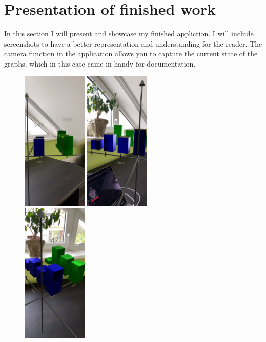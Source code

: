 \chapter{Presentation of finished work}

In this section I will present and showcase my finished appliction. I will include screenshots to have a better representation and understanding for the reader.
The camera function in the application allows you to capture the current state of the graphs, which in this case came in handy for documentation.

\begin{figure}[!ht]
    \centering
    \includegraphics[height=67mm, keepaspectratio]{../images/front.jpeg}\hspace{1cm}
    \includegraphics[height=67mm, keepaspectratio]{../images/side.jpeg}\\\vspace{5mm}
    \includegraphics[height=67mm, keepaspectratio]{../images/top.jpeg}\hspace{1cm}

\end{figure}
